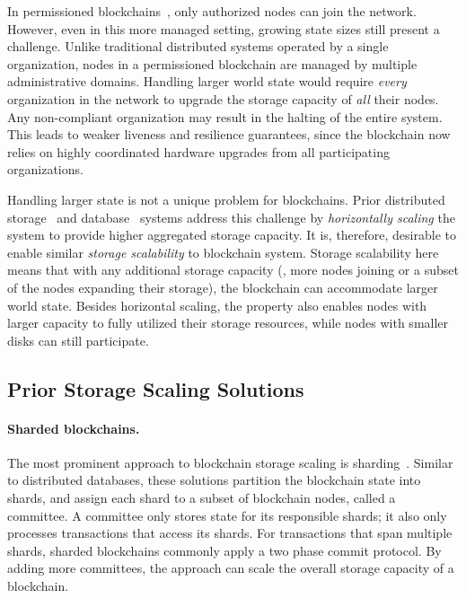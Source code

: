 In permissioned blockchains~\cite{hyperledger}, only authorized nodes can join the network.
However, even in this more managed setting, growing state sizes still present a challenge.
Unlike traditional distributed systems operated by a single organization, nodes in a permissioned blockchain are managed by multiple administrative domains.
Handling larger world state would require \emph{every} organization in the network to upgrade the storage capacity of \emph{all} their nodes.
Any non-compliant organization may result in the halting of the entire system.
This leads to weaker liveness and resilience guarantees, since the blockchain now relies on highly coordinated hardware upgrades from all participating organizations.

Handling larger state is not a unique problem for blockchains.
Prior distributed storage~\cite{gfs, bigtable} and database~\cite{spanner} systems address this challenge by \emph{horizontally scaling} the system to provide higher aggregated storage capacity.
It is, therefore, desirable to enable similar \emph{storage scalability} to blockchain system.
Storage scalability here means that with any additional storage capacity (\eg, more nodes joining or a subset of the nodes expanding their storage), the blockchain can accommodate larger world state.
Besides horizontal scaling, the property also enables nodes with larger capacity to fully utilized their storage resources, while nodes with smaller disks can still participate.

\subsection{Prior Storage Scaling Solutions}
\label{sec:bg:prior}

\paragraph{Sharded blockchains.}
The most prominent approach to blockchain storage scaling is sharding~\cite{ruan2021blockchains,el2019blockchaindb,hong2024gridb,amiri2021sharper,hellings2021byshard,kokoris2018omniledger,dang2019towards,zamani2018rapidchain}.
Similar to distributed databases, these solutions partition the blockchain state into shards, and assign each shard to a subset of blockchain nodes, called a committee.
A committee only stores state for its responsible shards;
it also only processes transactions that access its shards.
For transactions that span multiple shards, sharded blockchains commonly apply a two phase commit protocol.
By adding more committees, the approach can scale the overall storage capacity of a blockchain.

